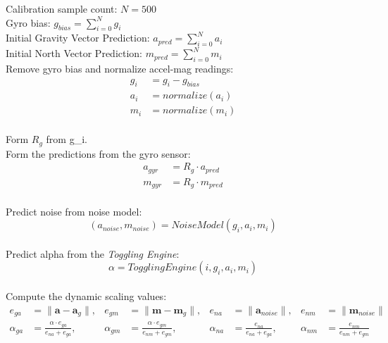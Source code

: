 \documentclass{iutbscthesis}
\begin{document}
\begin{algorithm} 
\caption{Modified CF algorithm}\label{CFalgo}
\footnotesize{}
\SetAlgoLined{}

\vspace{12pt}
Calibration sample count: $N=500$\\
Gyro bias: $g_{bias} = \sum_{i=0}^{N}g_i$ \\
Initial Gravity Vector Prediction: $a_{pred} = \sum_{i=0}^{N}a_i $ \\
Initial North Vector Prediction: $m_{pred} = \sum_{i=0}^{N}m_i $ \\
\vspace{12pt}
{
Remove gyro bias and normalize accel-mag readings: 
\begin{align*}
    g_i&=g_i-g_{bias}\\
    a_i&=normalize(a_i)\\
    m_i&=normalize(m_i)
\end{align*}\\
Form $R_g$ from g_i.\\
Form the predictions from the gyro sensor:
\begin{align*}
a_{gyr} &= R_g\cdot a_{pred}\\
m_{gyr} &= R_g\cdot m_{pred}   
\end{align*}\\

Predict noise from noise model: $$(a_{noise},m_{noise}) = NoiseModel(g_i,a_i,m_i)$$\\
Predict alpha from the \textit{Toggling Engine}: $$\alpha = TogglingEngine(i,g_i,a_i,m_i)$$\\

Compute the dynamic scaling values:
\begin{align*}
e_{ga} &= \lVert \mathbf{a} - \mathbf{a}_g \rVert, &
e_{gm} &= \lVert \mathbf{m} - \mathbf{m}_g \rVert, &
e_{na} &= \lVert \mathbf{a}_{noise} \rVert, &
e_{nm} &= \lVert \mathbf{m}_{noise} \rVert \\
\alpha_{ga} &= \frac{\alpha \cdot e_{ga}}{e_{na} + e_{ga}}, &
\alpha_{gm} &= \frac{\alpha \cdot e_{gm}}{e_{nm} + e_{gm}}, &
\alpha_{na} &= \frac{e_{na}}{e_{na} + e_{ga}}, &
\alpha_{nm} &= \frac{e_{nm}}{e_{nm} + e_{gm}}
\end{align*}\\

}
\end{algorithm}
\end{document}
